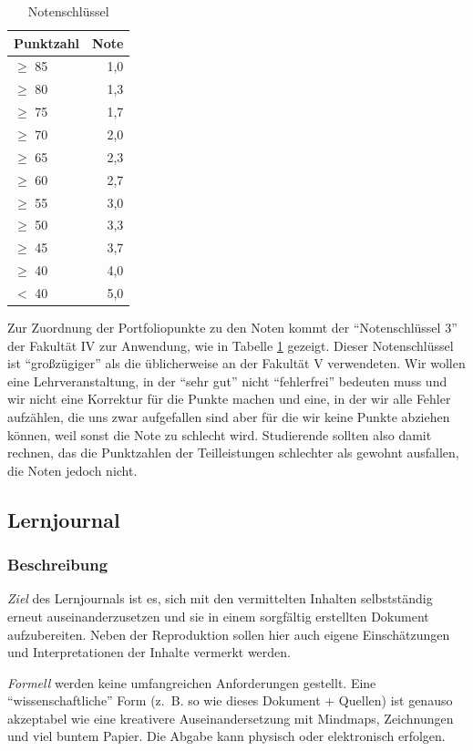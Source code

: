 \documentclass[DIV=15,headinclude]{scrartcl}
\begin{document}
\begin{table}
	\centering
	\caption{Notenschlüssel}
	\label{tab:notenschlüssel}
	\begin{tabular}{lr}
		\toprule
		Punktzahl & Note \\
		\midrule
		$\geq$ 85 & 1,0 \\
		$\geq$ 80 & 1,3 \\
		$\geq$ 75 & 1,7 \\
		$\geq$ 70 & 2,0 \\
		$\geq$ 65 & 2,3 \\
		$\geq$ 60 & 2,7 \\
		$\geq$ 55 & 3,0 \\
		$\geq$ 50 & 3,3 \\
		$\geq$ 45 & 3,7 \\
		$\geq$ 40 & 4,0 \\
		$<$ 40  & 5,0 \\
		\bottomrule
	\end{tabular}
\end{table}

Zur Zuordnung der Portfoliopunkte zu den Noten kommt der "`Notenschlüssel 3"' der Fakultät IV zur Anwendung, wie in Tabelle \ref{tab:notenschlüssel} gezeigt. Dieser Notenschlüssel ist "`großzügiger"' als die üblicherweise an der Fakultät V verwendeten. Wir wollen eine Lehrveranstaltung, in der "`sehr gut"' nicht "`fehlerfrei"' bedeuten muss und wir nicht eine Korrektur für die Punkte machen und eine, in der wir alle Fehler aufzählen, die uns zwar aufgefallen sind aber für die wir keine Punkte abziehen können, weil sonst die Note zu schlecht wird. Studierende sollten also damit rechnen, das die Punktzahlen der Teilleistungen schlechter als gewohnt ausfallen, die Noten jedoch nicht.

\subsection{Lernjournal}

\subsubsection{Beschreibung}
\emph{Ziel} des Lernjournals ist es, sich mit den vermittelten Inhalten selbstständig erneut auseinanderzusetzen und sie in einem sorgfältig erstellten Dokument aufzubereiten. Neben der Reproduktion sollen hier auch eigene Einschätzungen und Interpretationen der Inhalte vermerkt werden.

\emph{Formell} werden keine umfangreichen Anforderungen gestellt. Eine "`wissenschaftliche"' Form (z.~B. so wie dieses Dokument + Quellen) ist genauso akzeptabel wie eine kreativere Auseinandersetzung mit Mindmaps, Zeichnungen und viel buntem Papier. Die Abgabe kann physisch oder elektronisch erfolgen.
\end{document}
